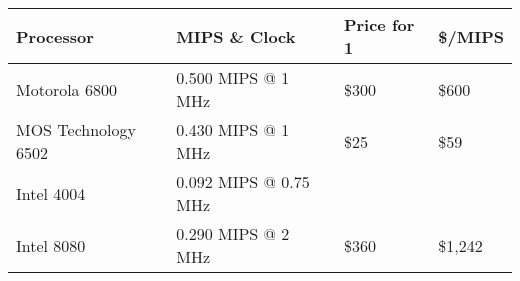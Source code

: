 \begin{tabular}{|l|l|l|l|}
\hline
\textbf{Processor} &
\textbf{MIPS \& Clock} &
\textbf{Price for 1} &
\textbf{\$/MIPS} \\
\hline

Motorola 6800 &
0.500 MIPS @ 1 MHz &
\$300 &
\$600 \\

MOS Technology 6502 &
0.430 MIPS @ 1 MHz &
\$25 &
\$59 \\

Intel 4004 &
0.092 MIPS @ 0.75 MHz &
 &
 \\

Intel 8080 &
0.290 MIPS @ 2 MHz &
\$360 &
\$1,242 \\


\hline
\end{tabular}
